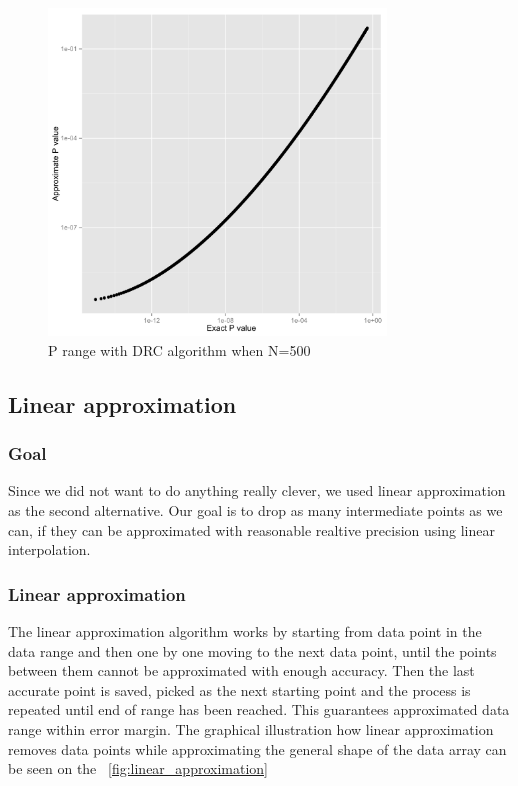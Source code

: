 \documentclass[12pt]{article}
\begin{document}
\begin{figure}[H]
  \centering
  \includegraphics[width=0.8\textwidth]{PvsP50}
  \caption{P range with DRC algorithm when N=500}
  \label{fig:PdivPapproxDrcWhenN500}
\end{figure}

\subsection{Linear approximation}

\subsubsection{Goal}

Since we did not want to do anything really clever, we used linear approximation as the second alternative. Our goal is to drop as many intermediate points as we can, if they can be approximated with reasonable realtive precision using linear interpolation.

\subsubsection{Linear approximation}
The linear approximation algorithm works by starting from data point in the data range and then one by one moving to the next data point, until the points between them cannot be approximated with enough accuracy. Then the last accurate point is saved, picked as the next starting point and the process is repeated until end of range has been reached. This guarantees approximated data range within error margin. The graphical illustration how linear approximation removes data points while approximating the general shape of the data array can be seen on the ~\ref{fig:linear_approximation}
\end{document}
